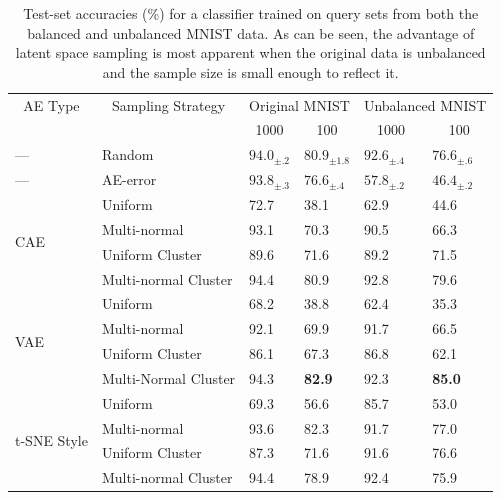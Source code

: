 \documentclass[a4paper]{article}
\begin{document}
\begin{table}[]
  \centering
  \begin{tabular}{|l|l|m{3em} m{3em}|m{3em} m{3em}|}
    \hline
    \multicolumn{1}{|c|}{AE Type} & \multicolumn{1}{|c|}{Sampling Strategy}
    & \multicolumn{2}{|c|}{Original MNIST} & \multicolumn{2}{|c|}{Unbalanced MNIST} \\
    & & \multicolumn{1}{|c}{1000} & \multicolumn{1}{c|}{100} & \multicolumn{1}{|c}{1000} & \multicolumn{1}{c|}{100} \\
    \hline
    --- & Random & $94.0_{\pm .2}$ & $80.9_{\pm 1.8}$ & $92.6_{\pm .4}$ & $76.6_{\pm .6}$\\
    \hline
    --- & AE-error & $93.8_{\pm .3}$ & $76.6_{\pm .4}$ & $57.8_{\pm .2}$ & $46.4_{\pm .2}$ \\
    \hline
    \multirow{4}{4em}{CAE}
    & Uniform
      & 72.7 & 38.1 & 62.9 & 44.6 \\
    & Multi-normal
      & 93.1 & 70.3 & 90.5 & 66.3 \\
    & Uniform Cluster
      & 89.6 & 71.6 & 89.2 & 71.5 \\
    & Multi-normal Cluster
      & 94.4 & 80.9 & 92.8 & 79.6 \\
    \hline
    \multirow{4}{4em}{VAE}
    & Uniform
      & 68.2 & 38.8 & 62.4 & 35.3 \\
    & Multi-normal
      & 92.1 & 69.9 & 91.7 & 66.5 \\
    & Uniform Cluster
      & 86.1 & 67.3 & 86.8 & 62.1 \\
    & Multi-Normal Cluster
      & 94.3 & \textbf{82.9} & 92.3 & \textbf{85.0} \\
    \hline
    \multirow{4}{4em}{t-SNE Style}
    & Uniform
      & 69.3 & 56.6 & 85.7 & 53.0 \\
    & Multi-normal
      & 93.6 & 82.3 & 91.7 & 77.0 \\
    & Uniform Cluster
      & 87.3 & 71.6 & 91.6 & 76.6 \\
    & Multi-normal Cluster
      & 94.4 & 78.9 & 92.4 & 75.9 \\
    \hline
  \end{tabular}
  \caption{Test-set accuracies (\%) for a classifier trained on query sets from
    both the balanced and unbalanced MNIST data. As can be seen, the advantage
    of latent space sampling is most apparent when the original data is
    unbalanced and the sample size is small enough to reflect it.}
  \label{tab:results}
\end{table}
\end{document}
